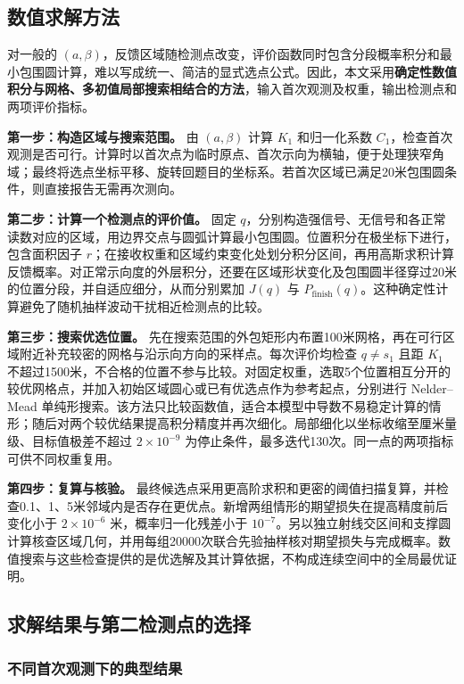 \subsection{数值求解方法}

对一般的 \((a,\beta)\)，反馈区域随检测点改变，评价函数同时包含分段概率积分和最小包围圆计算，难以写成统一、简洁的显式选点公式。因此，本文采用\textbf{确定性数值积分与网格、多初值局部搜索相结合的方法}，输入首次观测及权重，输出检测点和两项评价指标。

\textbf{第一步：构造区域与搜索范围。} 由 \((a,\beta)\) 计算 \(K_1\) 和归一化系数 \(C_1\)，检查首次观测是否可行。计算时以首次点为临时原点、首次示向为横轴，便于处理狭窄角域；最终将选点坐标平移、旋转回题目的坐标系。若首次区域已满足20米包围圆条件，则直接报告无需再次测向。

\textbf{第二步：计算一个检测点的评价值。} 固定 \(q\)，分别构造强信号、无信号和各正常读数对应的区域，用边界交点与圆弧计算最小包围圆。位置积分在极坐标下进行，包含面积因子 \(r\)；在接收权重和区域约束变化处划分积分区间，再用高斯求积计算反馈概率。对正常示向度的外层积分，还要在区域形状变化及包围圆半径穿过20米的位置分段，并自适应细分，从而分别累加 \(J(q)\) 与 \(P_{\mathrm{finish}}(q)\)。这种确定性计算避免了随机抽样波动干扰相近检测点的比较。

\textbf{第三步：搜索优选位置。} 先在搜索范围的外包矩形内布置100米网格，再在可行区域附近补充较密的网格与沿示向方向的采样点。每次评价均检查 \(q\ne s_1\) 且距 \(K_1\) 不超过1500米，不合格的位置不参与比较。对固定权重，选取5个位置相互分开的较优网格点，并加入初始区域圆心或已有优选点作为参考起点，分别进行 Nelder--Mead 单纯形搜索。该方法只比较函数值，适合本模型中导数不易稳定计算的情形；随后对两个较优结果提高积分精度并再次细化。局部细化以坐标收缩至厘米量级、目标值极差不超过 \(2\times10^{-9}\) 为停止条件，最多迭代130次。同一点的两项指标可供不同权重复用。

\textbf{第四步：复算与核验。} 最终候选点采用更高阶求积和更密的阈值扫描复算，并检查0.1、1、5米邻域内是否存在更优点。新增两组情形的期望损失在提高精度前后变化小于 \(2\times10^{-6}\) 米，概率归一化残差小于 \(10^{-7}\)。另以独立射线交区间和支撑圆计算核查区域几何，并用每组20000次联合先验抽样核对期望损失与完成概率。数值搜索与这些检查提供的是优选解及其计算依据，不构成连续空间中的全局最优证明。

\subsection{求解结果与第二检测点的选择}

\subsubsection{不同首次观测下的典型结果}

